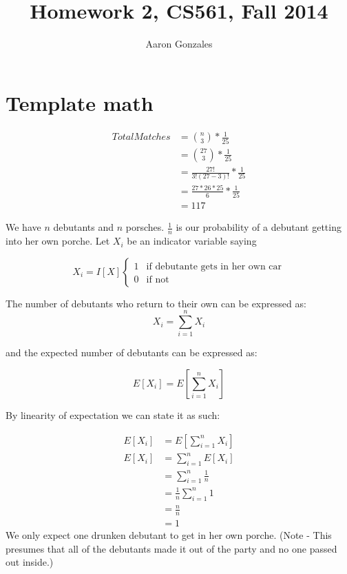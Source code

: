 \documentclass[titlepage]{article}\usepackage[]{graphicx}\usepackage[]{color}
\begin{document}
\title{Homework 2, CS561, Fall 2014}
\author{Aaron Gonzales}
\maketitle


\section{Template math}
\begin{align*}
	Total Matches &={n \choose 3} * \frac{1}{25} \\
					&= {27 \choose 3}   * \frac{1}{25} \\
					&=   \frac{27!}{3!(27-3)!} * \frac{1}{25} \\
					&= \frac{27 * 26 * 25}{6} * \frac{1}{25}  \\
					&= 117
\end{align*}


We have $n$ debutants and $n$ porsches. 
$\frac{1}{n}$ is our probability of a debutant getting into her own porche.
Let $X_i$ be an indicator variable saying 

\[
	X_i = I[X]
	\begin{cases}
		1 & \text{if debutante gets in her own car} \\
		0 & \text{if not} 
	\end{cases}
\]

The number of debutants who return to their own can be expressed as:
\[ X_i = \sum_{i=1}^n X_i \]

and the expected number of debutants can be expressed as:

\[ E [X_i] = E \left[ \sum_{i=1}^n X_i \right] \]

By linearity of expectation we can state it as such:

\begin{align*}
	E [X_i] &= E \left[ \sum_{i=1}^n X_i \right] \\
	E [X_i] &=  \sum_{i=1}^n E[X_i] \\ 
	&=  \sum_{i=1}^n \frac{1}{n} \\ 
	&=  \frac{1}{n} \sum_{i=1}^n 1 \\
	&= \frac{n}{n} \\
	& = 1
\end{align*}
We only expect one drunken debutant to get in her own porche. (Note - This presumes
that all of the debutants made it out of the party and no one passed out
inside.)
\end{document}
